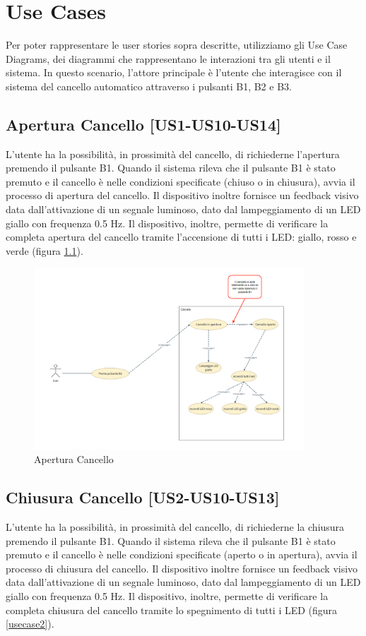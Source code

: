 \chapter{\bf{Use Cases}}
\noindent Per poter rappresentare le user stories sopra descritte, utilizziamo gli Use Case Diagrams, dei diagrammi che rappresentano le interazioni tra gli utenti e il sistema.
In questo scenario, l'attore principale è l'utente che  interagisce con il sistema del cancello automatico attraverso i pulsanti B1, B2 e B3.


\section{Apertura Cancello [US1-US10-US14]}
L'utente ha la possibilità, in prossimità del cancello, di richiederne l'apertura premendo il pulsante B1. Quando il sistema rileva che il pulsante B1 è stato premuto e il cancello è nelle condizioni specificate (chiuso o in chiusura), avvia il processo di apertura del cancello. Il dispositivo inoltre fornisce un feedback visivo data dall'attivazione di un segnale luminoso, dato dal lampeggiamento di un LED giallo con frequenza 0.5 Hz.
Il dispositivo, inoltre, permette di verificare la completa apertura del cancello tramite l'accensione di tutti i LED: giallo, rosso e verde (figura \ref{usecase1}).

\begin{figure}
    \centering
    \includegraphics[width=0.9\textwidth]{figures/usecase_1.png}
    \caption{Apertura Cancello}
    \label{usecase1}
\end{figure}


\section{Chiusura Cancello [US2-US10-US13]}
L'utente ha la possibilità, in prossimità del cancello, di richiederne la chiusura premendo il pulsante B1. Quando il sistema rileva che il pulsante B1 è stato premuto e il cancello è nelle condizioni specificate (aperto o in apertura), avvia il processo di chiusura del cancello. Il dispositivo inoltre fornisce un feedback visivo data dall'attivazione di un segnale luminoso, dato dal lampeggiamento di un LED giallo con frequenza 0.5 Hz.
Il dispositivo, inoltre, permette di verificare la completa chiusura del cancello tramite lo spegnimento di tutti i LED (figura \ref{usecase2}).

